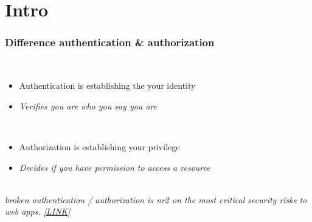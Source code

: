 \section{Intro}

\frame{\tableofcontents[currentsection]}

\begin{frame}
    \frametitle{Difference authentication \& authorization}

    \\
    \begin{itemize}
        \item Authentication is establishing the your identity
        \item \textit{Verifies you are who you say you are}
    \end{itemize}

    \vfill

    \\
    \begin{itemize}
        \item Authorization is establishing your privilege
        \item \textit{Decides if you have permission to access a resource}
    \end{itemize}

    \vfill

    \\
    \textit{broken authentication / authorization is nr2 on 
    the most critical security risks to web apps. 
    \href{https://owasp.org/www-project-top-ten/}{[LINK]}}
\end{frame}